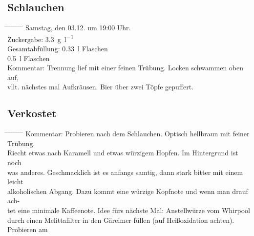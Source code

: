 \documentclass[12pt,oneside,a4paper]{scrartcl}
\begin{document}
\subsection*{Schlauchen}
	\begin{tabbing}
		\hspace{1cm} \= \hspace{1cm} \= \hspace{1cm} \= \hspace{1cm} \= \hspace{1cm} \= \hspace{1cm} \= \hspace{1cm} \= \hspace{1cm} \= \kill
		\> Samstag, den 03.12. um 19:00 Uhr.\\
		\> Zuckergabe: \SI{3,3}{\gram\per\litre}\\
		\> Gesamtabfüllung: \> \> \> \> \SI{0,33}{\litre} Flaschen\\
		\> \> \> \> \> \SI{0,5}{\litre} Flaschen\\
		\> Kommentar: \>\>\> Trennung lief mit einer feinen Trübung. Locken schwammen oben auf,\\
		\>\>vllt. nächstes mal Aufkräusen. Bier über zwei Töpfe gepuffert.
	\end{tabbing}
%
\subsection*{Verkostet}
\begin{tabbing}
	\hspace{1cm} \= \hspace{1cm} \= \hspace{1cm} \= \hspace{1cm} \= \hspace{1cm} \= \hspace{1cm} \= \hspace{1cm} \= \hspace{1cm} \= \kill
	\> Kommentar: \>\>\> Probieren nach dem Schlauchen. Optisch hellbraun mit feiner Trübung.\\
	\>\>Riecht etwas nach Karamell und etwas würzigem Hopfen. Im Hintergrund ist noch \\
	\>\>was anderes. Geschmacklich ist es anfangs samtig, dann stark bitter mit einem leicht \\
	\>\>alkoholischen Abgang. Dazu kommt eine würzige Kopfnote und wenn man drauf ach-\\
	\>\>tet eine minimale Kaffeenote. Idee fürs nächste Mal: Anstellwürze vom Whirpool \\
	\>\>durch einen Melittafilter in den Gäreimer füllen (auf Heißoxidation achten).\\
	\>\>\>\>Probieren am 
\end{tabbing}
\end{document}
